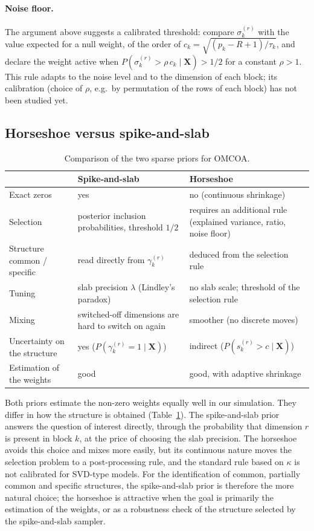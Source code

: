 \documentclass[11pt]{article}
\newcommand{\X}{\mathbf{X}}
\begin{document}
\paragraph{Noise floor.} The argument above suggests a calibrated threshold: compare $\sigma_k^{(r)}$ with the value
expected for a null weight, of the order of $c_k=\sqrt{(p_k-R+1)/\tau_k}$, and declare the weight active when
$P(\sigma_k^{(r)}>\rho\,c_k\mid\X)>1/2$ for a constant $\rho>1$. This rule adapts to the noise level and to the
dimension of each block; its calibration (choice of $\rho$, e.g.\ by permutation of the rows of each block) has
not been studied yet.

\subsection{Horseshoe versus spike-and-slab}

\begin{table}[ht]
\centering
\caption{Comparison of the two sparse priors for OMCOA.}\label{tab:comp}
\begin{tabular}{p{4.2cm}p{5.1cm}p{5.1cm}}
\toprule
 & Spike-and-slab & Horseshoe \\
\midrule
Exact zeros & yes & no (continuous shrinkage) \\
Selection & posterior inclusion probabilities, threshold $1/2$ & requires an additional rule (explained variance, ratio, noise floor) \\
Structure common / specific & read directly from $\gamma_k^{(r)}$ & deduced from the selection rule \\
Tuning & slab precision $\lambda$ (Lindley's paradox) & no slab scale; threshold of the selection rule \\
Mixing & switched-off dimensions are hard to switch on again & smoother (no discrete moves) \\
Uncertainty on the structure & yes ($P(\gamma_k^{(r)}=1\mid\X)$) & indirect ($P(s_k^{(r)}>c\mid\X)$) \\
Estimation of the weights & good & good, with adaptive shrinkage \\
\bottomrule
\end{tabular}
\end{table}

Both priors estimate the non-zero weights equally well in our simulation. They differ in how the structure is
obtained (Table~\ref{tab:comp}). The spike-and-slab prior answers the question of interest directly, through the
probability that dimension $r$ is present in block $k$, at the price of choosing the slab precision. The horseshoe
avoids this choice and mixes more easily, but its continuous nature moves the selection problem to a post-processing
rule, and the standard rule based on $\kappa$ is not calibrated for SVD-type models. For the identification of
common, partially common and specific structures, the spike-and-slab prior is therefore the more natural choice; the
horseshoe is attractive when the goal is primarily the estimation of the weights, or as a robustness check of the
structure selected by the spike-and-slab sampler.
\end{document}
